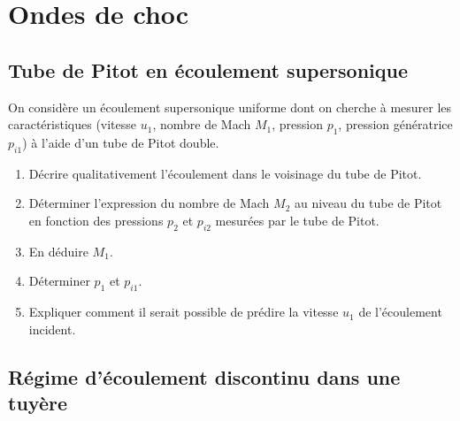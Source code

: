


\setcounter{section}{11}

\section{Ondes de choc}


\subsection{Tube de Pitot en \'ecoulement supersonique}

On considère un \'ecoulement supersonique uniforme dont on cherche à mesurer les caract\'eristiques
(vitesse $u_1$, nombre de Mach $M_1$, pression $p_1$, pression g\'en\'eratrice $p_{i1}$) 
à l'aide d'un tube de Pitot double.
\begin{enumerate}
\item
D\'ecrire qualitativement l'\'ecoulement dans le voisinage du tube de Pitot.
\item
D\'eterminer l'expression du nombre de Mach $M_2$ au niveau du tube de Pitot en fonction
des pressions $p_2$ et $p_{i2}$ mesur\'ees par le tube de Pitot.
\item
En d\'eduire $M_1$.
\item
D\'eterminer $p_1$ et $p_{i1}$.
\item
Expliquer comment il serait possible de pr\'edire la vitesse $u_1$ de l'\'ecoulement incident. 
\end{enumerate}
 
\subsection{R\'egime d'\'ecoulement discontinu dans une tuyère}

